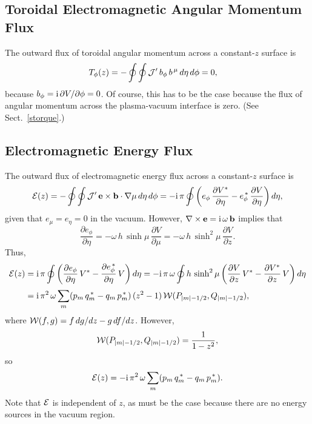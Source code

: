 \documentclass[12pt,prb,aps,notitlepage]{revtex4-1}
\begin{document}
\subsection{Toroidal Electromagnetic Angular Momentum Flux}
The outward flux of toroidal angular momentum across a constant-$z$ surface is
\begin{align}
T_\phi(z) &= -\oint\oint {\cal J}' \,b_\phi\,b^{\,\mu}\,d\eta\,d\phi = 0,
\end{align}
because $b_\phi = {\rm i}\,\partial V/\partial\phi = 0$. Of course, this has to be the case because the flux of angular momentum across the plasma-vacuum
interface is zero. (See Sect.~\ref{storque}.)

\subsection{Electromagnetic Energy Flux}
The outward flux of electromagnetic energy flux across a constant-$z$ surface is
\begin{align}
{\cal E}(z) = -\oint\oint {\cal J}'\,{\bf e}\times {\bf b}\cdot\nabla \mu\,d\eta\,d\phi= -{\rm i}\,\pi\oint\left(e_\phi\,\frac{\partial V^\ast}{\partial\eta}
- e_\phi^{\,\ast}\,\frac{\partial V}{\partial\eta}\right)d\eta,
\end{align}
given that $e_\mu=e_\eta=0$ in the vacuum. 
However, $\nabla\times{\bf e}= {\rm i}\,\omega\,{\bf b}$ implies that
\begin{equation}
\frac{\partial e_\phi}{\partial\eta} = - \omega\,h\,\sinh\mu\,\frac{\partial V}{\partial \mu}= - \omega\,h\,\sinh^2\mu\,\frac{\partial V}{\partial z}. 
\end{equation}
Thus,
\begin{align}
{\cal E}(z) &= {\rm i}\,\pi\oint\left(\frac{\partial e_\phi}{\partial\eta}\,V^\ast - \frac{\partial e_\phi^{\,\ast}}{\partial\eta}\,V\right)d\eta= 
-{\rm i}\,\pi\,\omega\oint h\,\sinh^2\mu\left(\frac{\partial V}{\partial z}\,V^\ast - \frac{\partial V^\ast}{\partial z}\,V\right) d\eta\nonumber\\[0.5ex]
&= {\rm i}\,\pi^2\,\omega\sum_m(p_m\,q_m^{\,\ast}-q_m\,p_m^{\,\ast})\,(z^2-1)\,{\cal W}(P_{|m|-1/2},Q_{|m|-1/2}),
 \end{align}
 where ${\cal W}(f,g)= f\,dg/dz-g\,df/dz$. However,
 \begin{equation}
 {\cal W}(P_{|m|-1/2},Q_{|m|-1/2}) = \frac{1}{1-z^2},
 \end{equation}
 so
 \begin{equation}\label{e168g}
 {\cal E}(z)=- {\rm i}\,\pi^2\,\omega\sum_m(p_m\,q_m^{\,\ast}-q_m\,p_m^{\,\ast}).
 \end{equation}
 Note that ${\cal E}$ is independent of $z$, as must be the case because there are no energy sources in the vacuum region. 
\end{document}
